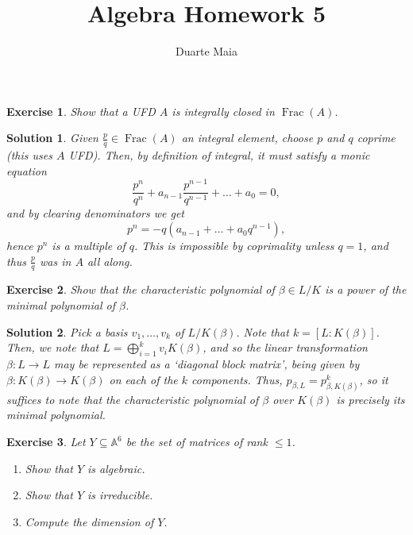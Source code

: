 \documentclass{article}
\title{Algebra Homework 5}
\author{Duarte Maia}
\newtheorem{ex}{Exercise}
\theoremstyle{nonumberplain}
\newtheorem{sol}{Solution}
\DeclareMathOperator{\Frac}{Frac}
\newcommand{\Aff}{\mathbb{A}}
\begin{document}
\maketitle

\begin{ex}
Show that a UFD $A$ is integrally closed in $\Frac(A)$.
\end{ex}

\begin{sol}
Given $\frac pq \in \Frac(A)$ an integral element, choose $p$ and $q$ coprime (this uses $A$ UFD). Then, by definition of integral, it must satisfy a monic equation
\begin{equation}
\frac{p^n}{q^n} + a_{n-1} \frac{p^{n-1}}{q^{n-1}} + \dots + a_0 = 0,
\end{equation}
and by clearing denominators we get
\begin{equation}
p^n = - q (a_{n-1} + \dots + a_0 q^{n-1}),
\end{equation}
hence $p^n$ is a multiple of $q$. This is impossible by coprimality unless $q = 1$, and thus $\frac pq$ was in $A$ all along.
\end{sol}

\begin{ex}
Show that the characteristic polynomial of $\beta \in L/K$ is a power of the minimal polynomial of $\beta$.
\end{ex}

\begin{sol}
Pick a basis $v_1, \dots, v_k$ of $L/K(\beta)$. Note that $k = [L:K(\beta)]$. Then, we note that $L = \bigoplus_{i = 1}^k v_i K(\beta)$, and so the linear transformation $\beta \colon L \to L$ may be represented as a `diagonal block matrix', being given by $\beta \colon K(\beta) \to K(\beta)$ on each of the $k$ components. Thus, $p_{\beta,L} = p_{\beta,K(\beta)}^k$, so it suffices to note that the characteristic polynomial of $\beta$ over $K(\beta)$ is precisely its minimal polynomial.
\end{sol}

\begin{ex}
Let $Y \subseteq \Aff^6$ be the set of matrices of rank $\leq 1$.
\begin{enumerate}
\item Show that $Y$ is algebraic.
\item Show that $Y$ is irreducible.
\item Compute the dimension of $Y$.
\end{enumerate}
\end{ex}
\end{document}
